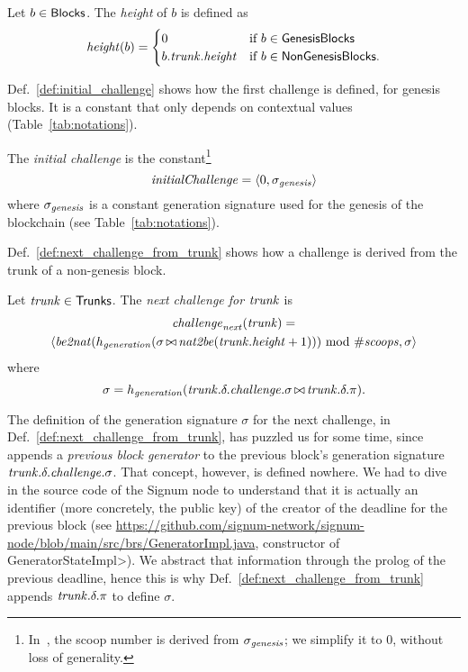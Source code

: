 \begin{definition}\label{def:block_height}
  Let $b\in{\mathsf{Blocks}}$. The \emph{height} of $b$ is defined as
  \[
  {\mathit{height}}(b)=\begin{cases}
  0 & \text{if $b\in{\mathsf{GenesisBlocks}}$}\\
  b.{\mathit{trunk}}.{\mathit{height}} & \text{if $b\in{\mathsf{NonGenesisBlocks}}$.}
  \end{cases}
  \]
\end{definition}
%
Def.~\ref{def:initial_challenge} shows how the first challenge is defined, for genesis blocks.
It is a constant that only depends on contextual values (Table~\ref{tab:notations}).
%
\begin{definition}[$\initialchallenge$]\label{def:initial_challenge}
  The \emph{initial challenge} is the constant\footnote{In~\cite{SignumPlotting},
  the scoop number is derived from $\sigma_{\mathit{genesis}}$; we simplify it to $0$, without loss
  of generality.}
  \[
    {\mathit{initialChallenge}}=
    \langle 0,\sigma_{\mathit{genesis}}\rangle
  \]
  where $\sigma_{\mathit{genesis}}$ is a constant generation signature used for the genesis of the blockchain
  (see Table~\ref{tab:notations}).
\end{definition}
%
Def.~\ref{def:next_challenge_from_trunk}
shows how a challenge is derived from the trunk of a non-genesis block.
%
\begin{definition}[$\nextchallenge(\trunk)$]\label{def:next_challenge_from_trunk}
  Let ${\mathit{trunk}}\in{\mathsf{Trunks}}$. The \emph{next challenge for ${\mathit{trunk}}$} is
  \begin{multline*}
    {\mathit{challenge}}_{\mathit{next}}({\mathit{trunk}})=\\
    \langle{\mathit{be2nat}}(h_{\mathit{generation}}(\sigma\operatorname*{\bowtie}{\mathit{nat2be}}({\mathit{trunk}}.{\mathit{height}}+1)))\text{ mod }{\#\mathit{scoops}},\sigma\rangle
  \end{multline*}
  where
  \[
  \sigma=h_{\mathit{generation}}({\mathit{trunk}}.\delta.{\mathit{challenge}}.\sigma\operatorname*{\bowtie}{\mathit{trunk}}.\delta.\pi).  
  \]
\end{definition}
%
The definition of the generation signature $\sigma$ for the next challenge,
in Def.~\ref{def:next_challenge_from_trunk},
has puzzled us for some time, since~\cite{SignumPlotting} appends a \emph{previous block generator}
to the previous block's generation signature ${\mathit{trunk}}.\delta.{\mathit{challenge}}.\sigma$.
That concept, however, is defined nowhere.
We had to dive in the source code of the Signum node
to understand that it is actually
an identifier (more concretely, the public key)
of the creator of the deadline for the previous block
(see \url{https://github.com/signum-network/signum-node/blob/main/src/brs/GeneratorImpl.java}, constructor of \<GeneratorStateImpl>).
We abstract that information through the prolog of the previous deadline, hence this is why
Def.~\ref{def:next_challenge_from_trunk} appends
${\mathit{trunk}}.\delta.\pi$ to define $\sigma$.

